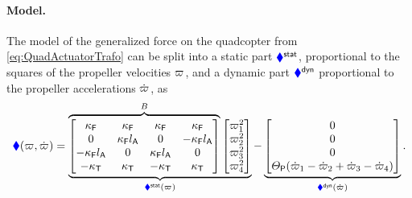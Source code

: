 \paragraph{Model.}
The model of the generalized force on the quadcopter from \eqref{eq:QuadActuatorTrafo} can be split into a static part $\genForceQuadStat$, proportional to the squares of the propeller velocities $\PropVel$, and a dynamic part $\genForceQuadDyn$ proportional to the propeller accelerations $\PropVeld$, as
\begin{align}\label{eq:QuadForceVelctorModel}
 \genForceQuad(\PropVel, \PropVeld)
 =
 \underbrace{
 \overbrace{\begin{bmatrix}
  \kappaF & \kappaF & \kappaF & \kappaF \\
  0 & \kappaF\ArmRadius & 0 & -\kappaF\ArmRadius \\
  -\kappaF\ArmRadius & 0 & \kappaF\ArmRadius & 0 \\
  -\kappaT & \kappaT & -\kappaT & \kappaT \\
 \end{bmatrix}}^{B}
 \begin{bmatrix} \PropVel[1]^2 \\ \PropVel[2]^2 \\ \PropVel[3]^2 \\ \PropVel[4]^2 \end{bmatrix}
 }_{\genForceQuadStat(\PropVel)}
 -
 \underbrace{\begin{bmatrix} 0 \\ 0 \\ 0 \\ \JP (\PropVeld[1] - \PropVeld[2] + \PropVeld[3] - \PropVeld[4]) \end{bmatrix}}_{\genForceQuadDyn(\PropVeld)}
 .
\end{align}

